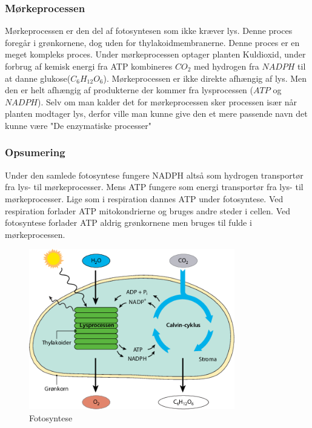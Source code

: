             \subsubsection*{Mørkeprocessen}
                Mørkeprocessen er den del af fotosyntesen som ikke kræver lys. Denne proces foregår i grønkornene, dog uden for thylakoidmembranerne. Denne proces er en meget kompleks proces. 
                Under mørkeprocessen optager planten Kuldioxid, under forbrug af kemisk energi fra ATP kombineres \begin{math}CO_2\end{math} med hydrogen fra \begin{math}NADPH\end{math} til at danne glukose(\begin{math}C_6H_{12}O_6\end{math}). Mørkeprocessen er ikke direkte afhængig af lys. Men den er helt afhængig af produkterne der kommer fra lysprocessen (\begin{math}ATP\end{math} og \begin{math}NADPH\end{math}). Selv om man kalder det for mørkeprocessen sker processen især når planten modtager lys, derfor ville man kunne give den et mere passende navn det kunne være "De enzymatiske processer"
            \subsubsection*{Opsumering} 
                Under den samlede fotosyntese fungere NADPH altså som hydrogen transportør fra lys- til mørkeprocesser. Mens ATP fungere som energi transportør fra lys- til mørkeprocesser. Lige som i respiration dannes ATP under fotosyntese. Ved respiration forlader ATP mitokondrierne og bruges andre steder i cellen. Ved fotosyntese forlader ATP aldrig grønkornene men bruges til fulde i mørkeprocessen.
                \begin{figure}[h]
                    \centering
                    \includegraphics[width=0.8\textwidth]{figurs/fotosyntese.png}
                    \caption{Fotosyntese}
                    \label{fig:fotosyntese}
                \end{figure}

